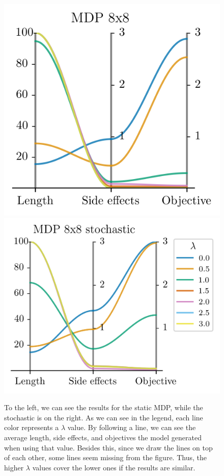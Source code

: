 \documentclass[12pt,A4]{report}
\theoremstyle{definition}
\begin{document}
\begin{figure}[H]
  \centering
  \includegraphics{"./figures/static_8x8_results.png"}
  \includegraphics{"./figures/static_8x8_stochastic_results.png"}
  \caption{To the left, we can see the results for the static MDP, while the stochastic is on the right. As we can see in the legend, each line color represents a $\lambda$ value. By following a line, we can see the average length, side effects, and objectives the model generated when using that value. Besides this, since we draw the lines on top of each other, some lines seem missing from the figure. Thus, the higher $\lambda$ values cover the lower ones if the results are similar.}
  \label{fig:results_static_8x8}
\end{figure}
\end{document}
